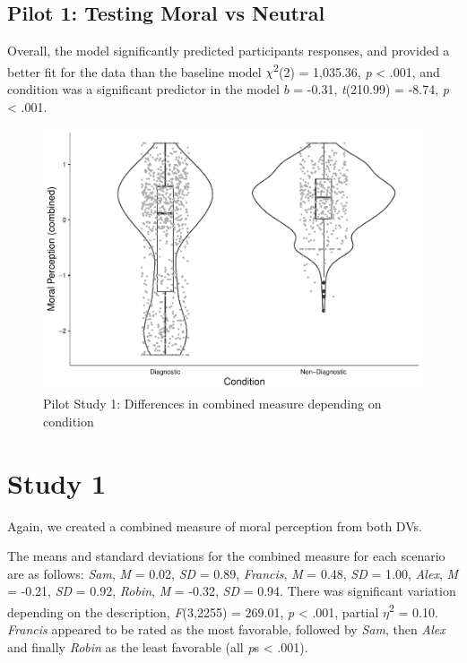 \documentclass[
  american,
  man,mask,floatsintext]{apa6}
\begin{document}
\hypertarget{pilot-1-testing-moral-vs-neutral}{%
\subsection{Pilot 1: Testing Moral vs Neutral}\label{pilot-1-testing-moral-vs-neutral}}

Overall, the model significantly predicted participants responses, and provided a better fit for the data than the baseline model \(\chi\)\textsuperscript{2}(2) = 1,035.36, \emph{p} \textless{} .001, and condition was a significant predictor in the model \(b\) = -0.31, \emph{t}(210.99) = -8.74, \emph{p} \textless{} .001.

\begin{figure}[!h]
\includegraphics[width=\textwidth,]{Supplementary_files/figure-latex/pilot1cobminedconditionplot-1} \caption{Pilot Study 1: Differences in combined measure depending on condition}\label{fig:pilot1cobminedconditionplot}
\end{figure}

\newpage

\hypertarget{study-1}{%
\section{Study 1}\label{study-1}}

Again, we created a combined measure of moral perception from both DVs.

The means and standard deviations for the combined measure for each scenario are as follows:
\emph{Sam},
\emph{M} = 0.02, \emph{SD} = 0.89,
\emph{Francis},
\emph{M} = 0.48, \emph{SD} = 1.00,
\emph{Alex},
\emph{M} = -0.21, \emph{SD} = 0.92,
\emph{Robin},
\emph{M} = -0.32, \emph{SD} = 0.94. There was significant variation depending on the description, \emph{F}(3,2255) = 269.01, \emph{p} \textless{} .001, partial \(\eta\)\textsuperscript{2} = 0.10. \emph{Francis} appeared to be rated as the most favorable, followed by \emph{Sam}, then \emph{Alex} and finally \emph{Robin} as the least favorable (all \emph{p}s \textless{} .001).
\end{document}

